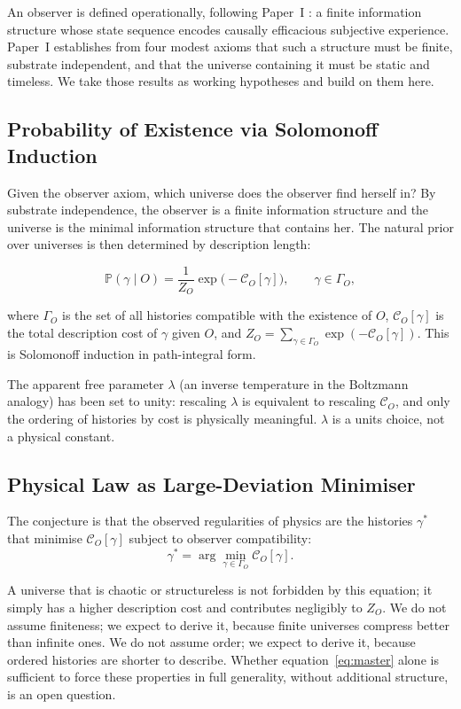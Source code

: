 \documentclass[11pt]{article}
\begin{document}
An observer is defined operationally, following Paper~I
\cite{meskanen2001}: a finite information structure whose state sequence
encodes causally efficacious subjective experience.
Paper~I establishes from four modest axioms that such a structure must
be finite, substrate independent, and that the universe containing it
must be static and timeless.
We take those results as working hypotheses and build on them here.

\subsection{Probability of Existence via Solomonoff Induction}

Given the observer axiom, which universe does the observer find herself
in?
By substrate independence, the observer is a finite information
structure and the universe is the minimal information structure that
contains her.
The natural prior over universes is then determined by description
length:

\begin{equation}
\mathbb{P}(\gamma \mid O)
= \frac{1}{Z_O}\exp\!\bigl(-\mathcal{C}_O[\gamma]\bigr),
\qquad \gamma \in \Gamma_O,
\label{eq:master}
\end{equation}

where $\Gamma_O$ is the set of all histories compatible with the
existence of $O$, $\mathcal{C}_O[\gamma]$ is the total description cost
of $\gamma$ given $O$, and $Z_O = \sum_{\gamma \in \Gamma_O}
\exp(-\mathcal{C}_O[\gamma])$.
This is Solomonoff induction \cite{solomonoff1964} in path-integral
form.

The apparent free parameter $\lambda$ (an inverse temperature in the
Boltzmann analogy) has been set to unity: rescaling $\lambda$ is
equivalent to rescaling $\mathcal{C}_O$, and only the ordering of
histories by cost is physically meaningful.
$\lambda$ is a units choice, not a physical constant.

\subsection{Physical Law as Large-Deviation Minimiser}

The conjecture is that the observed regularities of physics are the
histories $\gamma^*$ that minimise $\mathcal{C}_O[\gamma]$ subject to
observer compatibility:
\[
\gamma^* = \arg\min_{\gamma \in \Gamma_O} \mathcal{C}_O[\gamma].
\]

A universe that is chaotic or structureless is not forbidden by this
equation; it simply has a higher description cost and contributes
negligibly to $Z_O$.
We do not assume finiteness; we expect to derive it, because finite
universes compress better than infinite ones.
We do not assume order; we expect to derive it, because ordered
histories are shorter to describe.
Whether equation~\eqref{eq:master} alone is sufficient to force these
properties in full generality, without additional structure, is an open
question.
\end{document}
